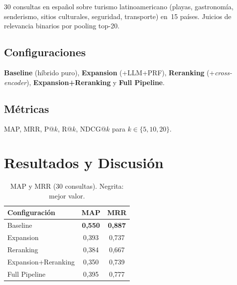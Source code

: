\documentclass[runningheads]{llncs}
\begin{document}
30 consultas en espa\~nol sobre turismo latinoamericano (playas,
gastronom\'ia, senderismo, sitios culturales, seguridad, transporte)
en~15 pa\'ises. Juicios de relevancia binarios por pooling top-20.

\subsection{Configuraciones}

\textbf{Baseline} (h\'ibrido puro), \textbf{Expansion} (+LLM+PRF),
\textbf{Reranking} (+\textit{cross-encoder}),
\textbf{Expansion+Reranking} y \textbf{Full Pipeline}.

\subsection{M\'etricas}

MAP, MRR, P@$k$, R@$k$, NDCG@$k$ para $k\in\{5,10,20\}$.

\section{Resultados y Discusi\'on}
\label{sec:results}

\begin{table}[t]
\centering
\caption{MAP y MRR (30 consultas). Negrita: mejor valor.}
\label{tab:main}
\begin{tabular}{lcc}
\toprule
\textbf{Configuraci\'on} & \textbf{MAP} & \textbf{MRR} \\
\midrule
Baseline              & \textbf{0{,}550} & \textbf{0{,}887} \\
Expansion             & 0{,}393          & 0{,}737          \\
Reranking             & 0{,}384          & 0{,}667          \\
Expansion+Reranking   & 0{,}350          & 0{,}739          \\
Full Pipeline         & 0{,}395          & 0{,}777          \\
\bottomrule
\end{tabular}
\end{table}
\end{document}
